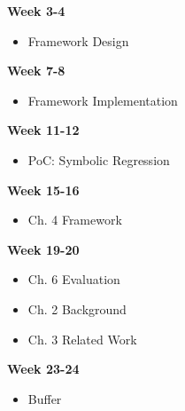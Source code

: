 \documentclass[a4paper,11pt]{article}
\begin{document}
\begin{minipage}[t]{.45\textwidth}
    \textbf{Week 3-4}
    \begin{itemize}
        \item Framework Design 
    \end{itemize}
    \textbf{Week 7-8}
    \begin{itemize}
        \item Framework Implementation
    \end{itemize}
    \textbf{Week 11-12}
    \begin{itemize}
        \item PoC: Symbolic Regression
    \end{itemize}
    \textbf{Week 15-16}
    \begin{itemize}
        \item Ch. 4 Framework
    \end{itemize}
    \textbf{Week 19-20}
    \begin{itemize}
        \item Ch. 6 Evaluation
        \item Ch. 2 Background
        \item Ch. 3 Related Work
    \end{itemize}
    \textbf{Week 23-24}
    \begin{itemize}
        \item Buffer
    \end{itemize}
\end{minipage}

\end{document}
